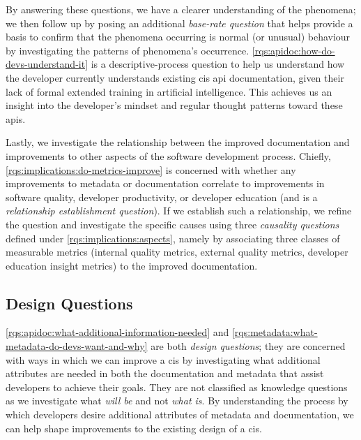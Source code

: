 By answering these questions, we have a clearer understanding of the phenomena; we then follow up by posing an additional \textit{base-rate question} that helps provide a basis to confirm that the phenomena occurring is normal (or unusual) behaviour by investigating the patterns of phenomena's occurrence. \ref{rqs:apidoc:how-do-devs-understand-it} is a descriptive-process question to help us understand how the developer currently understands existing \gls{cis} \gls{api} documentation, given their lack of formal extended training in artificial intelligence. This achieves us an insight into the developer's mindset and regular thought patterns toward these \glspl{api}.

Lastly, we investigate the relationship between the improved documentation and improvements to other aspects of the software development process. Chiefly, \ref{rqs:implications:do-metrics-improve} is concerned with whether any improvements to metadata or documentation correlate to improvements in software quality, developer productivity, or developer education (and is a \textit{relationship establishment question}). If we establish such a relationship, we refine the question and investigate the specific causes using three \textit{causality questions} defined under \ref{rqs:implications:aspects}, namely by associating three classes of measurable metrics (internal quality metrics, external quality metrics, developer education insight metrics) to the improved documentation.

\subsection{Design Questions}

\ref{rqs:apidoc:what-additional-information-needed} and \ref{rqs:metadata:what-metadata-do-devs-want-and-why} are both \textit{design questions}; they are concerned with ways in which we can improve a \gls{cis} by investigating what additional attributes are needed in both the documentation and metadata that assist developers to achieve their goals.  They are not classified as knowledge questions as we investigate what \textit{will be} and not \textit{what is}. By understanding the process by which developers desire additional attributes of metadata and documentation, we can help shape improvements to the existing design of a \gls{cis}. 